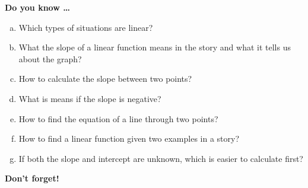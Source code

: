 \newpage



\bigskip

\noindent \textbf{Do you know \ldots} %

\begin{enumerate} [(a)]
\item Which types of situations are linear? 
\item What the slope of a linear function means in the story and what it tells us about the graph? 
\item How to calculate the slope between two points? 
\item What is means if the slope is negative? 
\item How to find the equation of a line through two points? 
\item How to find a linear function given two examples in a story? 
\item If both the slope and intercept are unknown, which is easier to calculate first? 
\end{enumerate}

\bigskip

\noindent \textbf{Don't forget!}
